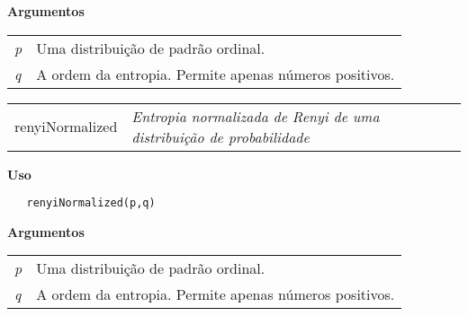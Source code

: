 \documentclass[12pt,letterpaper]{article}
\begin{document}
\textbf{Argumentos}

\begin{table}[!h]
\begin{center}
\begin{tabularx}{\textwidth}{X X}
\hspace{0.5cm} \textit{p} \vspace{0.5cm}& Uma distribuição de padrão ordinal.\vspace{0.5cm}\\
\hspace{0.5cm} \textit{q} \vspace{0.5cm}& A ordem da entropia. Permite apenas números positivos.\vspace{0.5cm}\\
\end{tabularx}
\end{center}
\end{table} 
\newpage


\hrulefill   

\begin{table}[!h]
\begin{center}
\begin{tabularx}{\textwidth}{ X X}
\hspace{0.5cm} renyiNormalized & \textit{Entropia normalizada de Renyi de uma distribuição de probabilidade}\\
\end{tabularx}
\end{center}
\end{table} 

\vspace{-0.5cm}

\hrulefill  

\vspace{0.5cm}

\textbf{Uso}

\begin{lstlisting}
   renyiNormalized(p,q)
\end{lstlisting}

\vspace{0.5cm}

\textbf{Argumentos}

\begin{table}[!h]
\begin{center}
\begin{tabularx}{\textwidth}{X X}
\hspace{0.5cm} \textit{p} \vspace{0.5cm}& Uma distribuição de padrão ordinal.\vspace{0.5cm}\\
\hspace{0.5cm} \textit{q} \vspace{0.5cm}& A ordem da entropia. Permite apenas números positivos.\vspace{0.5cm}\\
\end{tabularx}
\end{center}
\end{table} 
\end{document}
